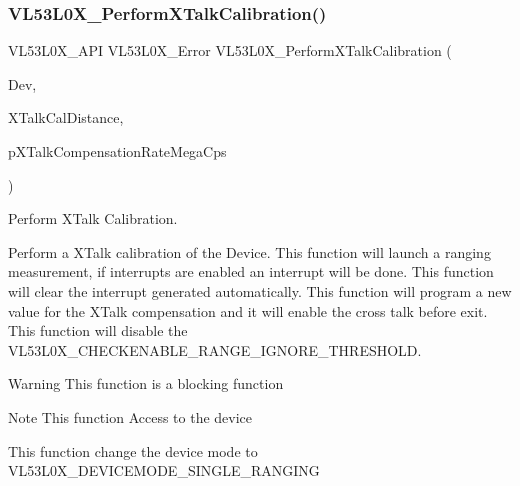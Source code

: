 \subsubsection{\texorpdfstring{V\+L53\+L0\+X\+\_\+\+Perform\+X\+Talk\+Calibration()}{VL53L0X\_PerformXTalkCalibration()}}
{\footnotesize\ttfamily V\+L53\+L0\+X\+\_\+\+A\+PI V\+L53\+L0\+X\+\_\+\+Error V\+L53\+L0\+X\+\_\+\+Perform\+X\+Talk\+Calibration (\begin{DoxyParamCaption}\item[{\hyperlink{group__VL53L0X__platform__group_ga2d6405308b1dd524b462f1b8fb97d167}{V\+L53\+L0\+X\+\_\+\+D\+EV}}]{Dev,  }\item[{\hyperlink{vl53l0x__types_8h_afb910790161809fc76e1a274a6349384}{Fix\+Point1616\+\_\+t}}]{X\+Talk\+Cal\+Distance,  }\item[{\hyperlink{vl53l0x__types_8h_afb910790161809fc76e1a274a6349384}{Fix\+Point1616\+\_\+t} $\ast$}]{p\+X\+Talk\+Compensation\+Rate\+Mega\+Cps }\end{DoxyParamCaption})}



Perform X\+Talk Calibration. 

Perform a X\+Talk calibration of the Device. This function will launch a ranging measurement, if interrupts are enabled an interrupt will be done. This function will clear the interrupt generated automatically. This function will program a new value for the X\+Talk compensation and it will enable the cross talk before exit. This function will disable the V\+L53\+L0\+X\+\_\+\+C\+H\+E\+C\+K\+E\+N\+A\+B\+L\+E\+\_\+\+R\+A\+N\+G\+E\+\_\+\+I\+G\+N\+O\+R\+E\+\_\+\+T\+H\+R\+E\+S\+H\+O\+LD.

\begin{DoxyWarning}{Warning}
This function is a blocking function
\end{DoxyWarning}
\begin{DoxyNote}{Note}
This function Access to the device

This function change the device mode to V\+L53\+L0\+X\+\_\+\+D\+E\+V\+I\+C\+E\+M\+O\+D\+E\+\_\+\+S\+I\+N\+G\+L\+E\+\_\+\+R\+A\+N\+G\+I\+NG
\end{DoxyNote}

